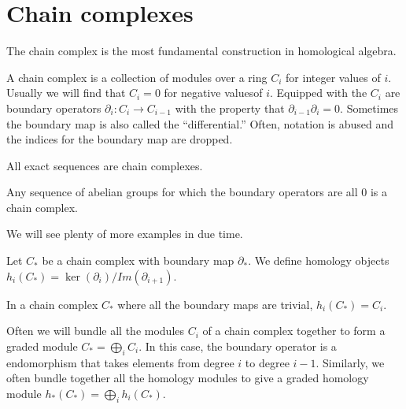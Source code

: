 \section{Chain complexes}
The chain complex is the most fundamental construction in
homological algebra.
\begin{definition} A chain complex is a collection of modules
over a ring $C_i$
for integer values of $i$. Usually we will find that $C_i=0$ for
negative valuesof $i$. Equipped with the $C_i$ are boundary
operators
$\partial_i:C_i\rightarrow C_{i-1}$ with the property that
$\partial_{i-1}\partial_i=0$. Sometimes the boundary map is also
called the
``differential.'' Often, notation is abused and the indices for
the boundary map are dropped.\end{definition}
\begin{example} All exact sequences are chain complexes.
\end{example}
\begin{example} Any sequence of abelian groups for which the
boundary operators
are all $0$ is a chain complex. \end{example}
We will see plenty of more examples in due time. 
\begin{definition} Let $C_*$ be a chain complex with boundary
map $\partial_*$.
We define homology objects
$h_i(C_*)=\ker(\partial_i)/Im(\partial_{i+1})$.
\end{definition}
\begin{example} In a chain complex $C_*$ where all the boundary
maps are
trivial, $h_i(C_*)=C_i$. \end{example}

Often we will bundle all the modules $C_i$ of a chain complex
together to form a graded module $C_*=\bigoplus_i C_i$. In this
case, the boundary operator is a
endomorphism that takes elements from degree $i$ to degree
$i-1$. Similarly, we
often bundle together all the homology modules to give a graded
homology module
$h_*(C_*)=\bigoplus_i h_i(C_*)$.

